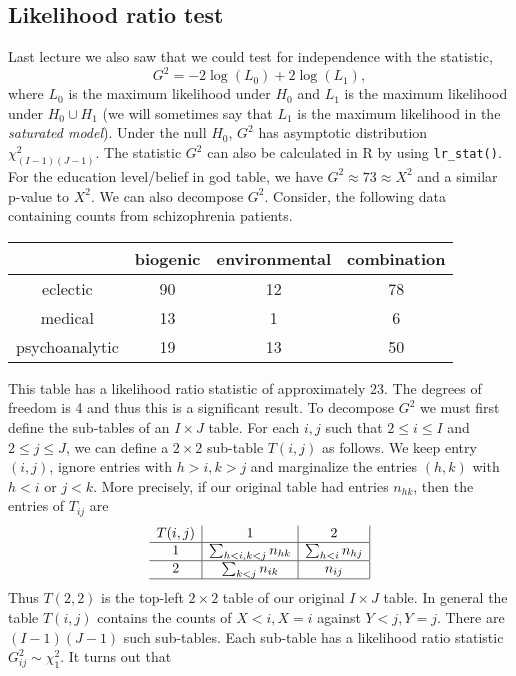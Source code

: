 \subsection{Likelihood ratio test}
Last lecture we also saw that we could test for independence with the statistic,
\[G^2 = -2\log(L_0) + 2\log(L_1),\]
where $L_0$ is the maximum likelihood under $H_0$ and $L_1$ is the maximum likelihood under $H_0 \cup H_1$ (we will sometimes say that $L_1$ is the maximum likelihood in the \emph{saturated model}). Under the null $H_0$, $G^2$ has asymptotic distribution $\chi^2_{(I-1)(J-1)}$. The statistic $G^2$ can also be calculated in R by using \texttt{lr\_stat()}. For the education level/belief in god table, we have $G^2 \approx 73 \approx X^2$ and a similar p-value to $X^2$.  We can also decompose $G^2$. Consider, the following data containing counts from schizophrenia patients.
\begin{center}
    \begin{tabular}{c|ccc}
       & biogenic & environmental & combination \\ 
        \hline
      eclectic & 90 & 12 & 78 \\ 
        medical & 13 & 1 & 6 \\ 
        psychoanalytic & 19 & 13 & 50
      \end{tabular}
\end{center}
This table has a likelihood ratio statistic of approximately 23. The degrees of freedom is 4 and thus this is a significant result. To decompose $G^2$ we must first define the sub-tables of an $I\times J$ table. For each $i,j$ such that $2 \le i \le I$ and $2 \le j \le J$, we can define a $2\times 2$ sub-table $T(i,j)$ as follows. We keep entry $(i,j)$, ignore entries with $h>i,k>j$ and marginalize the entries $(h,k)$ with $h < i$ or $j < k$. More precisely, if our original table had entries $n_{hk}$, then the entries of $T_{ij}$ are 
\[\begin{array}{c|c|c|}
    T(i,j)&1&2\\
    \hline 
    1&\sum_{h <i, k < j}n_{hk} & \sum_{h < i}n_{hj}\\
    \hline 
    2&\sum_{k < j} n_{ik} & n_{ij}\\
    \hline 
\end{array} \]
Thus $T(2,2)$ is the top-left $2\times 2$ table of our original $I\times J$ table. In general the table $T(i,j)$ contains the counts of $X < i, X=i$ against $Y <j,Y=j$. There are $(I-1)(J-1)$ such sub-tables. Each sub-table has a likelihood ratio statistic $G_{ij}^2 \sim \chi^2_1$. It turns out that 
